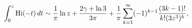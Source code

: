 \[\int_{0}^{z}\mathop{\mathrm{Hi}\/}\nolimits\!\left(-t\right)dt\sim\frac{1}{\pi%
}\mathop{\ln\/}\nolimits z+\frac{2\gamma+\mathop{\ln\/}\nolimits 3}{3\pi}+%
\frac{1}{\pi}\sum_{k=1}^{\infty}(-1)^{k-1}\frac{(3k-1)!}{k!(3z^{3})^{k}},\]